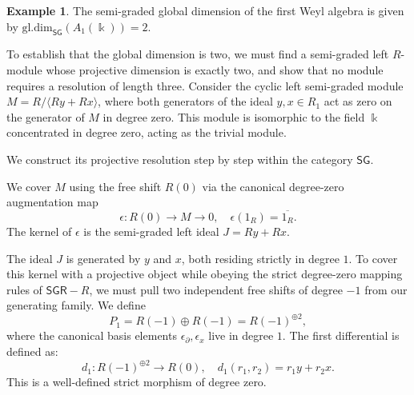 \documentclass[reqno]{amsart}
\theoremstyle{definition}
\newtheorem{example}[theorem]{Example}
\theoremstyle{remark}
\numberwithin{equation}{section}
\begin{document}
\begin{example}
The semi-graded global dimension of the first Weyl algebra is given by $\mathrm{gl.dim}_{\mathsf{SG}}({A_1(\Bbbk)}) = 2$.

To establish that the global dimension is two, we must find a semi-graded left $R$-module whose projective dimension is exactly two, and show that no module requires a resolution of length three. Consider the cyclic left semi-graded module $M = R / \langle Ry + Rx\rangle$, where both generators of the ideal $y, x \in R_1$ act as zero on the generator of $M$ in degree zero. This module is isomorphic to the field $\Bbbk$ concentrated in degree zero, acting as the trivial module.

We construct its projective resolution step by step within the category $\mathsf{SG}$.

We cover $M$ using the free shift $R(0)$ via the canonical degree-zero augmentation map 
    \[
    \epsilon: R(0) \longrightarrow M \longrightarrow 0, \quad \epsilon(1_R) = \overline{1_R}.
    \]
    The kernel of $\epsilon$ is the semi-graded left ideal $J = R y + Rx$.
    
   The ideal $J$ is generated by $y$ and $x$, both residing strictly in degree $1$. To cover this kernel with a projective object while obeying the strict degree-zero mapping rules of $\mathsf{SGR}-R$, we must pull two independent free shifts of degree $-1$ from our generating family. We define
    \[
    P_1 = R(-1) \oplus R(-1) = R(-1)^{\oplus 2},
    \]
    where the canonical basis elements $\epsilon_\partial, \epsilon_x$ live in degree $1$. The first differential is defined as:
    \[
    d_1: R(-1)^{\oplus 2} \longrightarrow R(0), \quad d_1(r_1, r_2) = r_1y + r_2 x.
    \]
    This is a well-defined strict morphism of degree zero.
    

\end{example}
\end{document}
